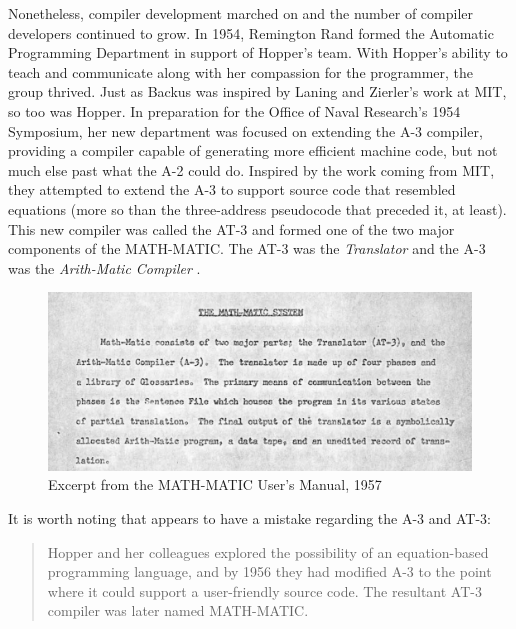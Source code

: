 Nonetheless, compiler development marched on and the number of compiler
developers continued to grow.
In 1954, Remington Rand formed the Automatic Programming Department
in support of Hopper's team.
With Hopper's ability to teach and communicate along with her compassion
for the programmer, the group thrived.
Just as Backus was inspired by Laning and Zierler's work at MIT, so too
was Hopper.
In preparation for the Office of Naval Research's 1954 Symposium,
her new department was focused on extending the A-3 compiler,
providing a compiler capable of generating more efficient machine code,
but not much else past what the A-2 could do.
Inspired by the work coming from MIT, they attempted to extend the A-3 to
support source code that resembled equations (more so than the three-address 
pseudocode that preceded it, at least).
This new compiler was called the AT-3 and formed one of the two major
components of the MATH-MATIC. The AT-3 was the \textit{Translator}
and the A-3 was the \textit{Arith-Matic Compiler}
\cite{ash_etal_1957_math-matic_manual}.

\begin{figure}[h]
    \centering
    \includegraphics[width=.7\textwidth]{resource/mathmatic-user-guide.png}
    \caption{Excerpt from the MATH-MATIC User's Manual, 1957}
    \label{fig:mathmatic-user-manual}
\end{figure}

It is worth noting that 
\cite{grace_hopper_and_the_invention_of_the_information_age_2009}
appears to have a mistake regarding the A-3 and AT-3:

\begin{quotation}
Hopper and her colleagues explored the possibility of an
equation-based programming language, and by 1956 they had
modified A-3 to the point where it could support a user-friendly
source code. The resultant AT-3 compiler was later named
MATH-MATIC.
\end{quotation}

